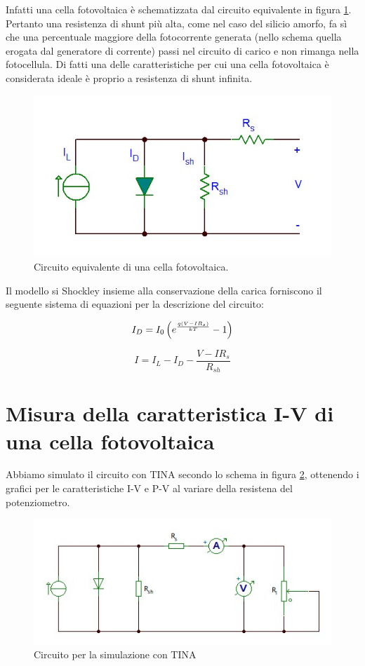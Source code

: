 \documentclass[journal, a4paper]{IEEEtran}
\begin{document}
Infatti una cella fotovoltaica è schematizzata dal circuito equivalente in figura \ref{fig:equiv}. Pertanto una resistenza di shunt più alta, come nel caso del silicio amorfo, fa sì che una percentuale maggiore della fotocorrente generata (nello schema quella erogata dal generatore di corrente) passi nel circuito di carico e non rimanga nella fotocellula. Di fatti una delle caratteristiche per cui una cella fotovoltaica è considerata ideale è proprio a resistenza di shunt infinita.

\begin{figure}[htp]
\centering
\includegraphics[scale=.5]{model}
\caption{Circuito equivalente di una cella fotovoltaica.}
\label{fig:equiv}
\end{figure}

Il modello si Shockley insieme alla conservazione della carica forniscono il seguente sistema di equazioni per la descrizione del circuito:

\begin{equation}
I_D = I_0 \, \Bigl(e^{\frac{q(V-IR_s)}{kT}}-1\Bigr)
\end{equation}

\begin{equation}
I = I_L - I_D - \frac{V-IR_s}{R_{sh}}
\end{equation}

\section{Misura della caratteristica I-V di una cella fotovoltaica}

Abbiamo simulato il circuito con TINA secondo lo schema in figura \ref{fig:simul}, ottenendo i grafici per le caratteristiche I-V e P-V al variare della resistena del potenziometro.

\begin{figure}[htp]
\centering
\includegraphics[scale=.4]{simul}
\caption{Circuito per la simulazione con TINA}
\label{fig:simul}
\end{figure}
\end{document}
